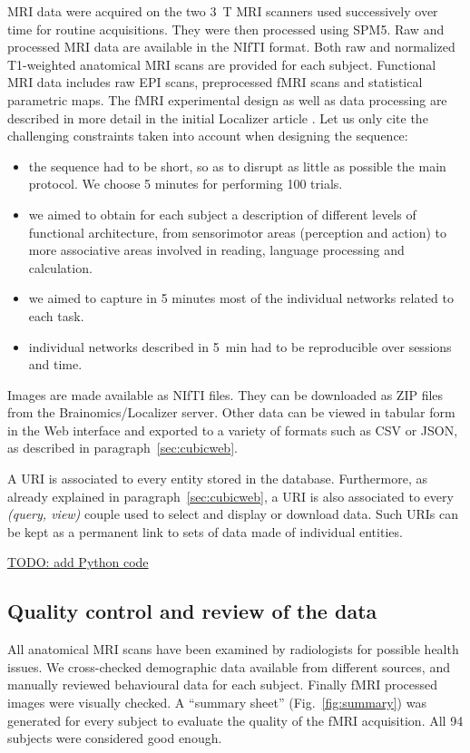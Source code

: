 \documentclass[review]{elsarticle}
\begin{document}
MRI data were acquired on the two 3~T MRI scanners used successively over time for routine acquisitions. They were then processed using SPM5. Raw and processed MRI data are available in the NIfTI format. Both raw and normalized T1-weighted anatomical MRI scans are provided for each subject. Functional MRI data includes raw EPI scans, preprocessed fMRI scans and statistical parametric maps. The fMRI experimental design as well as data processing are described in more detail in the initial Localizer article \cite{Pinel2007}. Let us only cite the challenging constraints taken into account when designing the sequence:
\begin{itemize}
\item the sequence had to be short, so as to disrupt as little as possible the main protocol. We choose 5 minutes for performing 100 trials.
\item we aimed to obtain for each subject a description of different levels of functional architecture, from sensorimotor areas (perception and action) to more associative areas involved in reading, language processing and calculation.
\item we aimed to capture in 5 minutes most of the individual networks related to each task.
\item individual networks described in 5~min had to be reproducible over sessions and time.
\end{itemize}

Images are made available as NIfTI files. They can be downloaded as ZIP files from the Brainomics/Localizer server. Other data can be viewed in tabular form in the Web interface and exported to a variety of formats such as CSV or JSON, as described in paragraph~\ref{sec:cubicweb}.

A URI is associated to every entity stored in the database. Furthermore, as already explained in paragraph~\ref{sec:cubicweb}, a URI is also associated to every \emph{(query, view)} couple used to select and display or download data. Such URIs can be kept as a permanent link to sets of data made of individual entities.

\underline{TODO: add Python code}


\subsection{Quality control and review of the data}

All anatomical MRI scans have been examined by radiologists for possible health issues. We cross-checked demographic data available from different sources, and manually reviewed behavioural data for each subject. Finally fMRI processed images were visually checked. A ``summary sheet'' (Fig.~\ref{fig:summary}) was generated for every subject to evaluate the quality of the fMRI acquisition. All 94 subjects were considered good enough.
\end{document}
